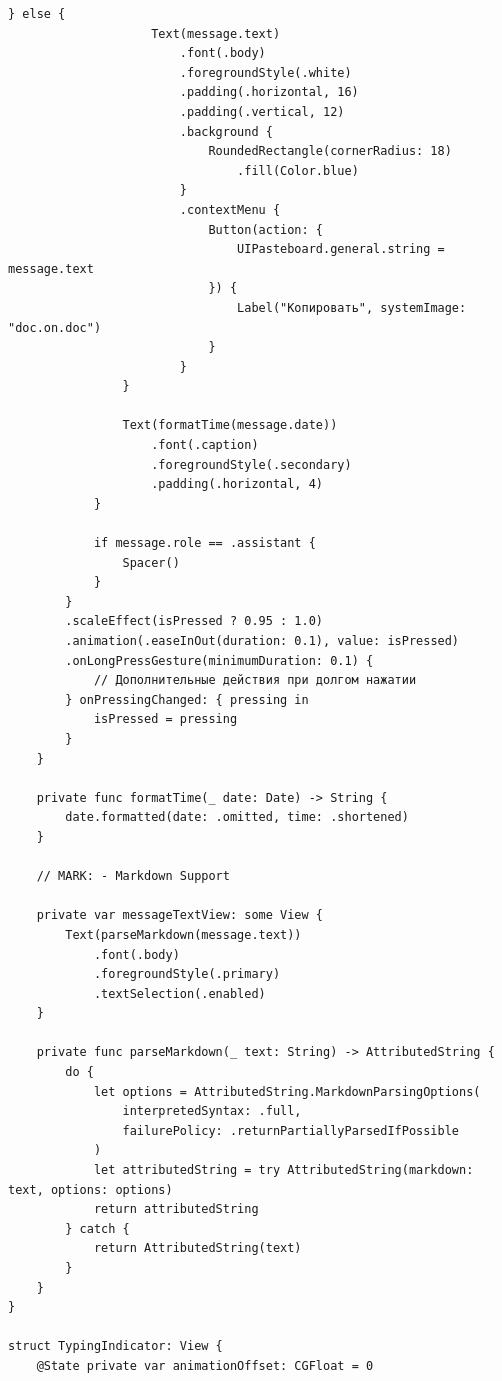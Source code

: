 \begin{lstlisting}[basicstyle=\tiny\ttfamily,breaklines=true]
                } else {
                    Text(message.text)
                        .font(.body)
                        .foregroundStyle(.white)
                        .padding(.horizontal, 16)
                        .padding(.vertical, 12)
                        .background {
                            RoundedRectangle(cornerRadius: 18)
                                .fill(Color.blue)
                        }
                        .contextMenu {
                            Button(action: {
                                UIPasteboard.general.string = message.text
                            }) {
                                Label("Копировать", systemImage: "doc.on.doc")
                            }
                        }
                }
                
                Text(formatTime(message.date))
                    .font(.caption)
                    .foregroundStyle(.secondary)
                    .padding(.horizontal, 4)
            }
            
            if message.role == .assistant {
                Spacer()
            }
        }
        .scaleEffect(isPressed ? 0.95 : 1.0)
        .animation(.easeInOut(duration: 0.1), value: isPressed)
        .onLongPressGesture(minimumDuration: 0.1) {
            // Дополнительные действия при долгом нажатии
        } onPressingChanged: { pressing in
            isPressed = pressing
        }
    }
    
    private func formatTime(_ date: Date) -> String {
        date.formatted(date: .omitted, time: .shortened)
    }
    
    // MARK: - Markdown Support
    
    private var messageTextView: some View {
        Text(parseMarkdown(message.text))
            .font(.body)
            .foregroundStyle(.primary)
            .textSelection(.enabled)
    }
    
    private func parseMarkdown(_ text: String) -> AttributedString {
        do {
            let options = AttributedString.MarkdownParsingOptions(
                interpretedSyntax: .full,
                failurePolicy: .returnPartiallyParsedIfPossible
            )
            let attributedString = try AttributedString(markdown: text, options: options)
            return attributedString
        } catch {
            return AttributedString(text)
        }
    }
}

struct TypingIndicator: View {
    @State private var animationOffset: CGFloat = 0
    

\end{lstlisting}

